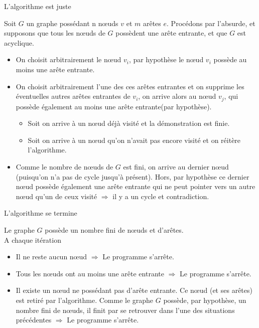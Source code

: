 \begin{frame}[allowframebreaks]{L'algorithme est juste}

Soit $G$ un graphe possédant n nœuds $v$ et $m$ arêtes $e$. Procédons par l'absurde, et supposons que tous les nœuds de $G$ possèdent une arête entrante, et que $G$ est acyclique.\\

\begin{itemize}
\item On choisit arbitrairement le nœud $v_i$, par hypothèse le nœud $v_i$ possède au moins une arête entrante. 
\item On choisit arbitrairement l'une des ces arêtes entrantes et on supprime les éventuelles autres arêtes entrantes de $v_i$, on arrive alors au nœud $v_j$, qui possède également au moins une arête entrante(par hypothèse).
\begin{itemize}
\item Soit on arrive à un nœud déjà visité et la démonstration est finie.
\item Soit on arrive à un nœud qu'on n'avait pas encore visité et on réitère l'algorithme.
\end{itemize}
\item Comme le nombre de nœuds de $G$ est fini, on arrive au dernier nœud (puisqu'on n'a pas de cycle jusqu'à présent). Hors, par hypothèse ce dernier nœud possède également une arête entrante qui ne peut pointer vers un autre nœud qu'un de ceux visité $\Rightarrow$ il y a un cycle et contradiction.
\end{itemize}

\end{frame}


\begin{frame}[allowframebreaks]{L'algorithme se termine}

Le graphe $G$ possède un nombre fini de nœuds et d'arêtes.\\

A chaque itération 
\begin{itemize}
\item Il ne reste aucun nœud $\Rightarrow$ Le programme s'arrête.
\item Tous les nœuds ont au moins une arête entrante $\Rightarrow$ Le programme s'arrête.
\item Il existe un nœud ne possédant pas d'arête entrante. Ce nœud (et ses arêtes) est retiré par l'algorithme. Comme le graphe $G$ possède, par hypothèse, un nombre fini de nœuds, il finit par se retrouver dans l'une des situations précédentes $\Rightarrow$ Le programme s'arrête.
\end{itemize} 

\end{frame}